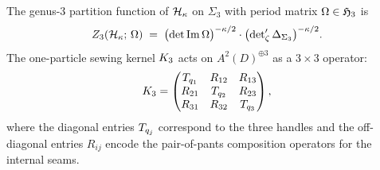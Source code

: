 \begin{theorem}%
\label{thm:thqg-X-genus-3-fredholm}%
%
The genus-$3$ partition function of $\mathcal{H}_\kappa$ on
$\Sigma_3$ with period matrix $\Omega \in \mathfrak{H}_3$ is
\begin{equation}\label{eq:thqg-X-genus-3-det}
Z_3(\mathcal{H}_\kappa;\,\Omega)
\;=\;
\bigl(\det\operatorname{Im}\Omega\bigr)^{-\kappa/2}
\cdot
\bigl(\det\nolimits'_\zeta\Delta_{\Sigma_3}\bigr)^{-\kappa/2}.
\end{equation}
The one-particle sewing kernel $K_3$ acts on
$A^2(D)^{\oplus 3}$ as a $3 \times 3$ operator:
\begin{equation}\label{eq:thqg-X-genus-3-block}
K_3
=
\begin{pmatrix}
T_{q_1} & R_{12} & R_{13} \\
R_{21} & T_{q_2} & R_{23} \\
R_{31} & R_{32} & T_{q_3}
\end{pmatrix},
\end{equation}
where the diagonal entries $T_{q_j}$ correspond to the
three handles and the off-diagonal entries $R_{ij}$ encode the
pair-of-pants composition operators for the internal seams.
\end{theorem}

